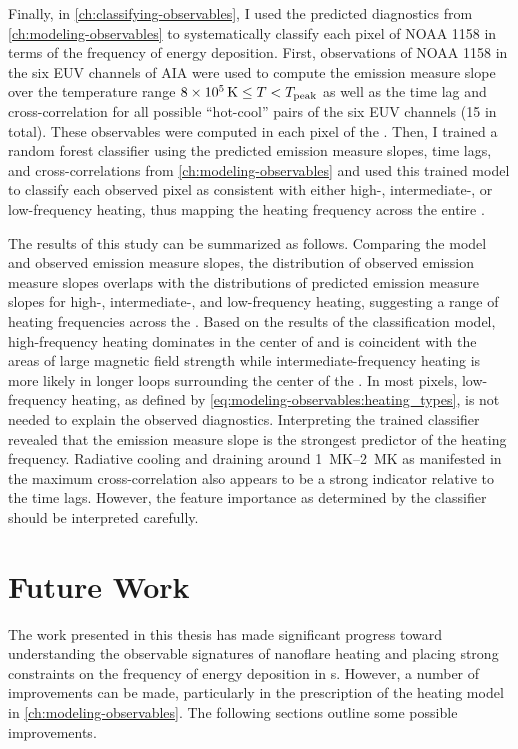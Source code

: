 Finally, in \autoref{ch:classifying-observables}, I used the predicted diagnostics from \autoref{ch:modeling-observables} to systematically classify each pixel of \AR{} NOAA 1158 in terms of the frequency of energy deposition. First, observations of NOAA 1158 in the six EUV channels of AIA were used to compute the emission measure slope over the temperature range $\SI{8e5}{\kelvin}\le T < T_\textup{peak}$ as well as the time lag and cross-correlation for all possible ``hot-cool'' pairs of the six EUV channels (15 in total). These observables were computed in each pixel of the \AR{}. Then, I trained a random forest classifier using the predicted emission measure slopes, time lags, and cross-correlations from \autoref{ch:modeling-observables} and used this trained model to classify each observed pixel as consistent with either high-, intermediate-, or low-frequency heating, thus mapping the heating frequency across the entire \AR{}.

The results of this study can be summarized as follows. Comparing the model and observed emission measure slopes, the distribution of observed emission measure slopes overlaps with the distributions of predicted emission measure slopes for high-, intermediate-, and low-frequency heating, suggesting a range of heating frequencies across the \AR{}. Based on the results of the classification model, high-frequency heating dominates in the center of \AR{} and is coincident with the areas of large magnetic field strength while intermediate-frequency heating is more likely in longer loops surrounding the center of the \AR{}. In most pixels, low-frequency heating, as defined by \autoref{eq:modeling-observables:heating_types}, is not needed to explain the observed diagnostics. Interpreting the trained classifier revealed that the emission measure slope is the strongest predictor of the heating frequency. Radiative cooling and draining around \SIrange{1}{2}{\mega\kelvin} as manifested in the maximum cross-correlation also appears to be a strong indicator relative to the time lags. However, the feature importance as determined by the classifier should be interpreted carefully.

\section{Future Work}\label{sec:future-work}

The work presented in this thesis has made significant progress toward understanding the observable signatures of nanoflare heating and placing strong constraints on the frequency of energy deposition in \AR s. However, a number of improvements can be made, particularly in the prescription of the heating model in \autoref{ch:modeling-observables}. The following sections outline some possible improvements.

